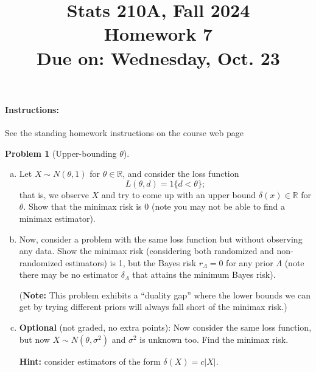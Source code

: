 \documentclass{article}
\newcommand{\RR}{\mathbb{R}}
\theoremstyle{definition}
\newtheorem{problem}{Problem}
\begin{document}
\title{Stats 210A, Fall 2024\\
  Homework 7 \\
  {\large {\bf Due on}: Wednesday, Oct. 23}}
\date{}

\maketitle

\paragraph{Instructions:} See the standing homework instructions on the course web page

\begin{problem}[Upper-bounding $\theta$]

\begin{enumerate}[(a)]
\item Let $X \sim N(\theta, 1)$ for $\theta\in\RR$, and consider the loss function
\[
L(\theta, d) = 1\{d < \theta\};
\]
that is, we observe $X$ and try to come up with an upper bound $\delta(x) \in \RR$ for $\theta$. Show that the minimax risk is 0 (note you may not be able to find a minimax estimator).




\item Now, consider a problem with the same loss function but without observing any data. Show the minimax risk (considering both randomized and non-randomized estimators) is 1, but the Bayes risk $r_\Lambda = 0$ for any prior $\Lambda$ (note there may be no estimator $\delta_\Lambda$ that attains the minimum Bayes risk).

({\bf Note:} This problem exhibits a ``duality gap'' where the lower bounds we can get by trying different priors will always fall short of the minimax risk.)



\item {\bf Optional} (not graded, no extra points): Now consider the same loss function, but now $X \sim N(\theta, \sigma^2)$ and $\sigma^2$ is unknown too. Find the minimax risk.

{\bf Hint:} consider estimators of the form $\delta(X) = c|X|$.



\end{enumerate}
\end{problem}
\end{document}
